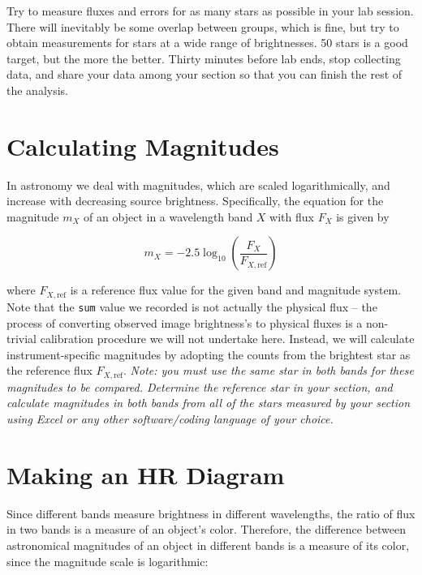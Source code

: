 Try to measure fluxes and errors for as many stars as possible in your lab session. There will inevitably be some overlap between groups, which is fine, but try to obtain measurements for stars at a wide range of brightnesses. 50 stars is a good target, but the more the better. Thirty minutes before lab ends, stop collecting data, and share your data among your section so that you can finish the rest of the analysis.

\section{Calculating Magnitudes}

In astronomy we deal with magnitudes, which are scaled logarithmically, and increase with decreasing source brightness. Specifically, the equation for the magnitude $m_X$ of an object in a wavelength band $X$ with flux $F_X$ is given by 

\begin{equation}
	m_{X} = -2.5\log_{10}\left(\frac{F_X}{F_{X,{\textrm{ref}}}}\right)
\end{equation}

where $F_{X,{\textrm{ref}}}$ is a reference flux value for the given band and magnitude system. Note that the \texttt{sum} value we recorded is not actually the physical flux -- the process of converting observed image brightness's to physical fluxes is a non-trivial calibration procedure we will not undertake here. Instead, we will calculate instrument-specific magnitudes by adopting the counts from the brightest star as the reference flux $F_{X,\textrm{ref}}$. \textit{Note: you must use the same star in both bands for these magnitudes to be compared. Determine the reference star in your section, and calculate magnitudes in both bands from all of the stars measured by your section using Excel or any other software/coding language of your choice.}


\section{Making an HR Diagram}

Since different bands measure brightness in different wavelengths, the ratio of flux in two bands is a measure of an object's color. Therefore, the difference between astronomical magnitudes of an object in different bands is a measure of its color, since the magnitude scale is logarithmic:

